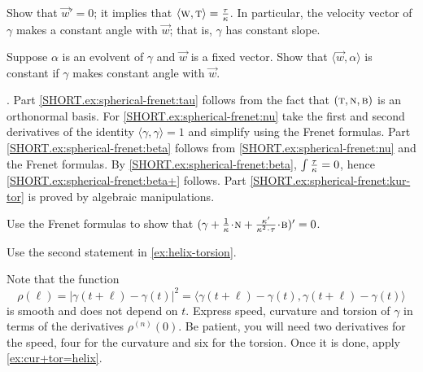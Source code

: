 Show that $\vec w'=0$;
it implies that $\langle \text{\sc{w}},\text{\sc{t}}\rangle=\tfrac{\tau}{\kappa}$.
In particular, the velocity vector of $\gamma$ makes a constant angle with $\vec w$; that is, $\gamma$ has constant slope.

Suppose $\alpha$ is an evolvent of $\gamma$ and $\vec w$ is a fixed vector.
Show that $\langle \vec w,\alpha\rangle$ is constant if $\gamma$ makes constant angle with $\vec w$.

\parbf{\ref{ex:spherical-frenet}}.
Part \ref{SHORT.ex:spherical-frenet:tau} follows from the fact that $(  \text{\sc{t}} , \text{\sc{n}}, \text{\sc{b}}  )$ is an orthonormal basis. For \ref{SHORT.ex:spherical-frenet:nu} take the first and second derivatives of the identity $\langle\gamma,\gamma\rangle=1$ and simplify using the Frenet formulas.
Part \ref{SHORT.ex:spherical-frenet:beta} follows from \ref{SHORT.ex:spherical-frenet:nu} and the Frenet formulas.
By \ref{SHORT.ex:spherical-frenet:beta}, $\int\tfrac{\tau}{\kappa}=0$, hence \ref{SHORT.ex:spherical-frenet:beta+} follows.
Part \ref{SHORT.ex:spherical-frenet:kur-tor} is proved by algebraic manipulations.

Use the Frenet formulas to show that $(\gamma+\tfrac1\kur\cdot \norm+\tfrac{\kur'}{\kur^2\cdot\tor}\cdot\bi)'=0$.



 Use the second statement in \ref{ex:helix-torsion}.

 Note that the function
\[\rho(\ell)=|\gamma(t+\ell)-\gamma(t)|^2=\langle \gamma(t+\ell)-\gamma(t),\gamma(t+\ell)-\gamma(t)\rangle\] 
is smooth and does not depend on $t$.
Express speed, curvature and torsion of $\gamma$ in terms of the derivatives $\rho^{(n)}(0)$.
Be patient, you will need two derivatives for the speed,
four for the curvature and six for the torsion.
Once it is done, apply \ref{ex:cur+tor=helix}.
